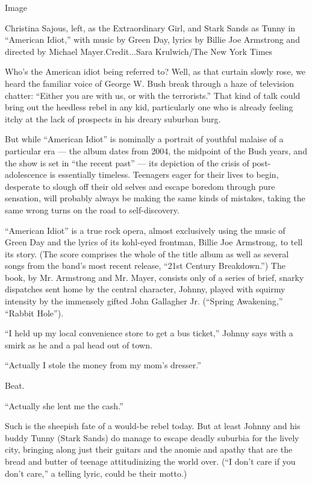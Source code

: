 Image

Christina Sajous, left, as the Extraordinary Girl, and Stark Sands as
Tunny in ``American Idiot,'' with music by Green Day, lyrics by Billie
Joe Armstrong and directed by Michael Mayer.Credit...Sara Krulwich/The
New York Times

Who's the American idiot being referred to? Well, as that curtain slowly
rose, we heard the familiar voice of George W. Bush break through a haze
of television chatter: ``Either you are with us, or with the
terrorists.'' That kind of talk could bring out the heedless rebel in
any kid, particularly one who is already feeling itchy at the lack of
prospects in his dreary suburban burg.

But while ``American Idiot'' is nominally a portrait of youthful malaise
of a particular era --- the album dates from 2004, the midpoint of the
Bush years, and the show is set in ``the recent past'' --- its depiction
of the crisis of post-adolescence is essentially timeless. Teenagers
eager for their lives to begin, desperate to slough off their old selves
and escape boredom through pure sensation, will probably always be
making the same kinds of mistakes, taking the same wrong turns on the
road to self-discovery.

``American Idiot'' is a true rock opera, almost exclusively using the
music of Green Day and the lyrics of its kohl-eyed frontman, Billie Joe
Armstrong, to tell its story. (The score comprises the whole of the
title album as well as several songs from the band's most recent
release, ``21st Century Breakdown.'') The book, by Mr. Armstrong and Mr.
Mayer, consists only of a series of brief, snarky dispatches sent home
by the central character, Johnny, played with squirmy intensity by the
immensely gifted John Gallagher Jr. (``Spring Awakening,'' ``Rabbit
Hole'').

``I held up my local convenience store to get a bus ticket,'' Johnny
says with a smirk as he and a pal head out of town.

``Actually I stole the money from my mom's dresser.''

Beat.

``Actually she lent me the cash.''

Such is the sheepish fate of a would-be rebel today. But at least Johnny
and his buddy Tunny (Stark Sands) do manage to escape deadly suburbia
for the lively city, bringing along just their guitars and the anomie
and apathy that are the bread and butter of teenage attitudinizing the
world over. (``I don't care if you don't care,'' a telling lyric, could
be their motto.)

